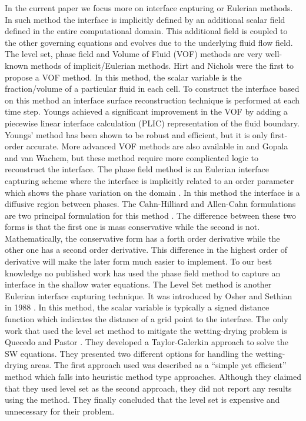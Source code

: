 \documentclass[review]{elsarticle}
\begin{document}
In the current paper we focus more on interface capturing or Eulerian methods. In such method the interface is implicitly defined by an additional scalar field defined in the entire 
computational domain. This additional field is coupled to the other governing equations and evolves due to the underlying fluid flow field.
The level set, phase field and Volume of Fluid (VOF) methods are very well-known methods of implicit/Eulerian methods.
Hirt and Nichols \cite{hirt1981vfv} were the first to propose a VOF method. 
In this method, the scalar variable is the fraction/volume of a particular fluid in each cell.
To construct the interface based on this method an interface surface reconstruction technique is performed at each time step. 
Youngs \cite{youngs1982tdm} achieved a significant improvement 
in the VOF by adding a piecewise linear interface calculation (PLIC) representation of the fluid boundary. 
Youngs' method has been shown to be robust and efficient, but it is only first-order accurate. 
More advanced VOF methods are also available in \cite{gerlach2006cvf} and Gopala and van Wachem\cite{gopala2008vfm}, but these method require more complicated logic to 
reconstruct the interface.
The phase field method is an Eulerian interface capturing scheme where the interface is implicitly related to an order parameter which shows the phase variation on the domain \cite{Anderson1998}. 
In this method the interface is a diffusive region between phases. 
The Cahn-Hilliard and Allen-Cahn formulations are two principal formulation for this method \cite{CahnHilliard1958i,CahnHilliard1958ii,Yang2006}. The difference between these two forms is 
that the first one is mass conservative while the second is not. Mathematically, the conservative form has a forth order derivative while the other one has a second order derivative. 
This difference in the highest order of derivative will make the later form much easier to implement.
To our best knowledge no published work has used the phase field method to capture an interface in the shallow water equations.
The Level Set method is another Eulerian interface capturing technique. It was introduced by Osher and Sethian in 1988 \cite{Osher1988}. In this method, the scalar variable is typically 
a signed distance function which indicates the distance of a grid point to the interface. 
The only work that used the level set method to mitigate the wetting-drying problem is Quecedo and Pastor \cite{quecedo2002rtg}. 
They developed a Taylor-Galerkin approach to solve the SW equations. They presented two 
different options for handling the wetting-drying areas. The first approach used was described as a ``simple yet efficient'' method which falls into heuristic method type approaches. 
Although they claimed that they used level set as the second approach, they did not report any results using the method.
They finally concluded that the level set is expensive and unnecessary for their problem.
\end{document}
